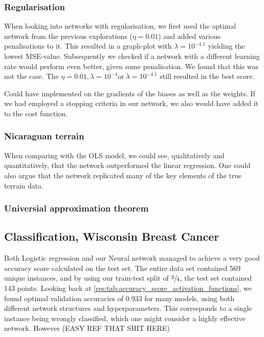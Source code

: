 
        \subsubsection{Regularisation}
            When looking into networks with regularisation, we first used the optimal network from the previous explorations ($\eta = 0.01$) and added various penalisations to it. This resulted in a graph-plot with $\lambda= 10^{-4.1}$ yielding the lowest MSE-value. Subsequently we checked if a network with a different learning rate would perform even better, given some penalisation. We found that this was not the case. The $\eta = 0.01, \lambda = 10^{-4} \text{or} \ \lambda = 10^{-4.1}$ still resulted in the best score. 

            Could have implemented on the gradients of the biases as well as the weights.  If we had employed a stopping criteria in our network, we also would have added it to the cost function. 

        \subsubsection{Nicaraguan terrain}
            When comparing with the OLS model, we could see, qualitatively and quantitatively, that the network outperformed the linear regression. One could also argue that the network replicated many of the key elements of the true terrain data.  
            
        \subsubsection{Universial approximation theorem}

    \subsection{Classification, Wisconsin Breast Cancer}
    Both Logistic regression and our Neural network managed to achieve a very good accuracy score calculated on the test set. The entire data set contained 569 unique instances, and by using our train-test split of $\sfrac{3}{4}$, the test set contained 143 points. Looking back at \cref{res:tab:accuracy_score_activation_functions}, we found optimal validation accuracies of $0.933$ for many models, using both different network structures and hyperparameters. This corresponds to a single instance being wrongly classified, which one might consider a highly effective network. However (EASY REF THAT SHIT HERE)
    

